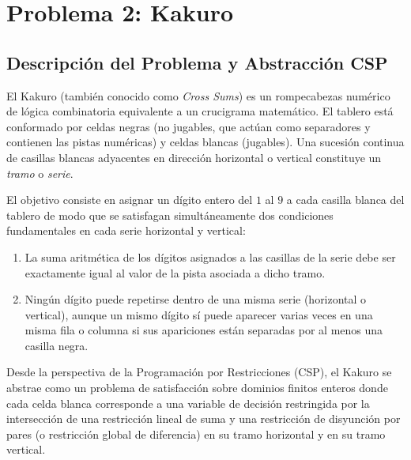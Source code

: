 \section{Problema 2: Kakuro}

\subsection{Descripción del Problema y Abstracción CSP}
El Kakuro (también conocido como \textit{Cross Sums}) es un rompecabezas numérico de lógica combinatoria equivalente a un crucigrama matemático. El tablero está conformado por celdas negras (no jugables, que actúan como separadores y contienen las pistas numéricas) y celdas blancas (jugables). Una sucesión continua de casillas blancas adyacentes en dirección horizontal o vertical constituye un \textit{tramo} o \textit{serie}.

El objetivo consiste en asignar un dígito entero del $1$ al $9$ a cada casilla blanca del tablero de modo que se satisfagan simultáneamente dos condiciones fundamentales en cada serie horizontal y vertical:
\begin{enumerate}
    \item La suma aritmética de los dígitos asignados a las casillas de la serie debe ser exactamente igual al valor de la pista asociada a dicho tramo.
    \item Ningún dígito puede repetirse dentro de una misma serie (horizontal o vertical), aunque un mismo dígito sí puede aparecer varias veces en una misma fila o columna si sus apariciones están separadas por al menos una casilla negra.
\end{enumerate}

Desde la perspectiva de la Programación por Restricciones (CSP), el Kakuro se abstrae como un problema de satisfacción sobre dominios finitos enteros donde cada celda blanca corresponde a una variable de decisión restringida por la intersección de una restricción lineal de suma y una restricción de disyunción por pares (o restricción global de diferencia) en su tramo horizontal y en su tramo vertical.


